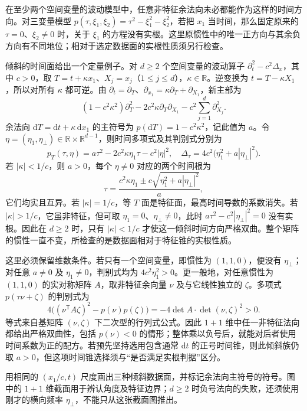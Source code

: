 \ProseParagraphBreak

在至少两个空间变量的波动模型中，任意非特征余法向未必都能作为这样的时间方向。对三变量模型 \(p(\tau,\xi_1,\xi_2)=\tau^2-\xi_1^2-\xi_2^2\)，若把 \(x_1\) 当时间，那么固定原来的 \(\tau=0\)、\(\xi_2\ne0\) 时，关于 \(\xi_1\) 的方程没有实根。这里原惯性中的唯一正方向与其余负方向有不同地位；相对于选定数据面的实根性质须另行检查。

\ProseParagraphBreak

倾斜的时间面给出一个定量例子。对 \(d\geq2\) 个空间变量的波动算子 \(\partial_t^2-c^2\Delta_x\)，其中 \(c>0\)，取 \(T=t+\kappa x_1\)、\(X_j=x_j\)（\(1\leq j\leq d\)），\(\kappa\in\mathbb R\)。逆变换为 \(t=T-\kappa X_1\)，所以对所有 \(\kappa\) 都可逆。由 \(\partial_t=\partial_T\)、\(\partial_{x_1}=\kappa\partial_T+\partial_{X_1}\)，新主部为
\[
 (1-c^2\kappa^2)\partial_T^2
 -2c^2\kappa\partial_T\partial_{X_1}
 -c^2\sum_{j=1}^d\partial_{X_j}^2.
\]
余法向 \(\mathrm{d}T=\mathrm{d}t+\kappa\,\mathrm{d}x_1\) 的主符号为 \(p(\mathrm{d}T)=1-c^2\kappa^2\)，记此值为 \(a\)。令 \(\eta=(\eta_1,\eta_\perp)\in\mathbb R\times\mathbb R^{d-1}\)，则时间多项式及其判别式分别为
\[
 p_T(\tau,\eta)=a\tau^2-2c^2\kappa\eta_1\tau-c^2|\eta|^2,
 \quad \Delta_\tau=4c^2\bigl(\eta_1^2+a|\eta_\perp|^2\bigr).
\]
若 \(|\kappa|<1/c\)，则 \(a>0\)，每个 \(\eta\ne0\) 对应的两个时间根为
\[
 \tau=\frac{c^2\kappa\eta_1\pm c\sqrt{\eta_1^2+a|\eta_\perp|^2}}a,
\]
它们均实且互异。若 \(|\kappa|=1/c\)，等 \(T\) 面是特征面，最高时间导数的系数消失。若 \(|\kappa|>1/c\)，它虽非特征，但可取 \(\eta_1=0\)、\(\eta_\perp\ne0\)，此时 \(a\tau^2-c^2|\eta_\perp|^2=0\) 没有实根。因此在 \(d\geq2\) 时，只有 \(|\kappa|<1/c\) 才使这一倾斜时间方向严格双曲。整个矩阵的惯性一直不变，所检查的是数据面相对于特征锥的实根性质。

\ProseParagraphBreak

这里必须保留维数条件。若只有一个空间变量，即惯性为 \((1,1,0)\)，便没有 \(\eta_\perp\)；对任意 \(a\ne0\) 及 \(\eta_1\ne0\)，判别式均为 \(4c^2\eta_1^2>0\)。更一般地，对任意惯性为 \((1,1,0)\) 的实对称矩阵 \(A\)，取非特征余向量 \(\nu\) 及与它线性独立的 \(\zeta\)。多项式 \(p(\tau\nu+\zeta)\) 的判别式为
\[
 4\bigl((\nu^{\mathsf T}A\zeta)^2-p(\nu)p(\zeta)\bigr)
 =-4\det A\cdot\det(\nu,\zeta)^2>0.
\]
等式来自基矩阵 \((\nu,\zeta)\) 下二次型的行列式公式。因此 \(1+1\) 维中任一非特征法向都给出严格双曲性，包括 \(p(\nu)<0\) 的情形；整体乘以负号后，就能对后者使用时间系数为正的配方。若预先坚持选用包含通常 \(\mathrm{d}t\) 的正号时间锥，则此倾斜族仍取 \(a>0\)，但这项时间锥选择须与“是否满足实根判据”区分。

用相同的 \((x_1/c,t)\) 尺度画出三种倾斜数据面，并标记余法向主符号的符号。图中的 \(1+1\) 维截面用于辨认角度及特征边界；\(d\geq2\) 时负号法向的失败，还须使用刚才的横向频率 \(\eta_\perp\)，不能只从这张截面图推出。


